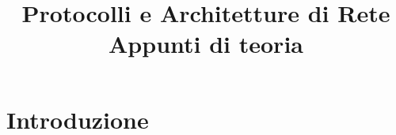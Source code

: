

\title{%
Protocolli e Architetture di Rete\\
\large Appunti di teoria}


\maketitle
\tableofcontents
\newpage
\section*{Introduzione}


